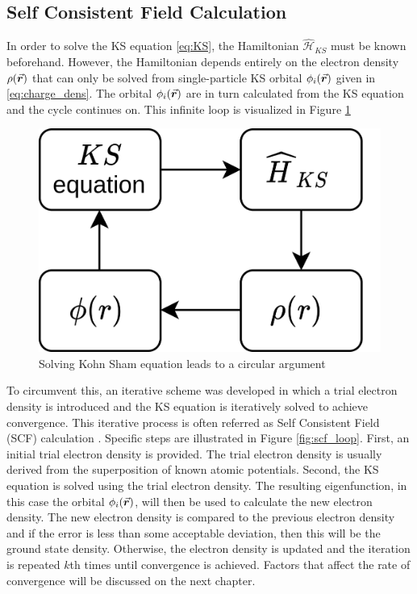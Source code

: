 \subsection{Self Consistent Field Calculation}
In order to solve the KS equation \eqref{eq:KS}, the Hamiltonian $\hat{\mathcal{H}}_{KS}$ must be known beforehand. However, the Hamiltonian depends entirely  on the electron density $\rho({\va*{r}})$ that can only be  solved from single-particle KS orbital $\phi_i(\va*{r})$ given in \eqref{eq:charge_dens}. The orbital $\phi_i(\va*{r})$ are in turn calculated from the KS equation and the cycle continues on. This infinite loop is visualized in Figure \ref{fig:KS_loop}

\begin{figure}[tbh!]
	\centering
	\includegraphics[width=0.3\linewidth]{"images/theory/KS_loop"}
	\caption[Kohn-Sham loop]{Solving Kohn Sham equation leads to a circular argument}
	\label{fig:KS_loop}
\end{figure}

To circumvent this, an iterative scheme was developed  in which a trial electron density is introduced and the KS equation is iteratively solved  to achieve convergence. This iterative process is often referred as Self Consistent Field (SCF) calculation \citep{Woods2019}. Specific steps are illustrated in Figure \ref{fig:scf_loop}. First, an initial trial electron density is provided. The trial electron density is usually derived from the superposition of known atomic potentials. Second,    the KS equation is solved using the trial electron density. The resulting eigenfunction, in this case the orbital $\phi_i(\va*{r})$, will then be used to calculate the new electron density. The new electron density is compared to the previous electron density and if the error is less than some acceptable deviation, then this will be the ground state density. Otherwise, the electron density is updated and the iteration is repeated $k$th times until convergence is achieved. Factors that affect the rate of convergence will be discussed on the next chapter.


